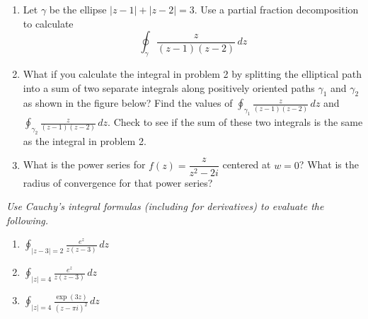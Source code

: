 \documentclass[11pt]{article}
\newcommand{\ds}{\displaystyle}
\begin{document}
\begin{enumerate}
\item Let $\gamma$ be the ellipse $|z-1|+|z-2| = 3$.  Use a partial fraction decomposition to calculate
$$\oint_\gamma \frac{z}{(z-1)(z-2)} \, dz$$
\begin{flushright}
\end{flushright}


\item What if you calculate the integral in problem 2 by splitting the elliptical path into a sum of two separate integrals along positively oriented paths $\gamma_1$ and $\gamma_2$ as shown in the figure below?  Find the values of $\ds \oint_{\gamma_1} \frac{z}{(z-1)(z-2)} \, dz$ and $\ds \oint_{\gamma_2} \frac{z}{(z-1)(z-2)} \, dz$.  Check to see if the sum of these two integrals is the same as the integral in problem 2. 
\begin{flushright}
\end{flushright}


\item What is the power series for $f(z) = \dfrac{z}{z^2 - 2i}$ centered at $w = 0$?  What is the radius of convergence for that power series?  
\vfill

\setcounter{enumCount}{\theenumi}
\end{enumerate}

\newpage

\noindent 
\textit{Use Cauchy's integral formulas (including for derivatives) to evaluate the following.}
\begin{multicols}{3}
\begin{enumerate}
\setcounter{enumi}{\theenumCount}
\item $\ds \oint_{|z-3|=2} \frac{e^z}{z(z-3)} \, dz$
\item $\ds \oint_{|z| = 4} \frac{e^z}{z(z-3)} \, dz$
\item $\ds \oint_{|z| = 4} \frac{\exp(3z)}{(z-\pi i)^2} \, dz$
\setcounter{enumCount}{\theenumi}
\end{enumerate}
\end{multicols}
\vfill
\vfill 
\end{document}
